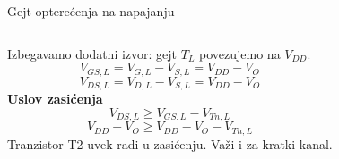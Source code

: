 \begin{frame}[label=09_1-s049]{Gejt opterećenja na napajanju}\setlength{\parskip}{2pt}\setlength{\abovedisplayskip}{4pt}\setlength{\belowdisplayskip}{4pt}\setlength{\abovedisplayshortskip}{3pt}\setlength{\belowdisplayshortskip}{3pt}
\begin{columns}[T,onlytextwidth]\centering {}Izbegavamo dodatni izvor: gejt $T_L$ povezujemo na $V_{DD}$.\[V_{GS,L}=V_{G,L}-V_{S,L}=V_{DD}-V_O\]
\[V_{DS,L}=V_{D,L}-V_{S,L}=V_{DD}-V_O\]
\textbf{Uslov zasićenja}\[V_{DS,L}\geq V_{GS,L}-V_{Tn,L}\]
\[V_{DD}-V_O\geq V_{DD}-V_O-V_{Tn,L}\]
Tranzistor T2 uvek radi u zasićenju. Važi i za kratki kanal.\end{columns}
\end{frame}
